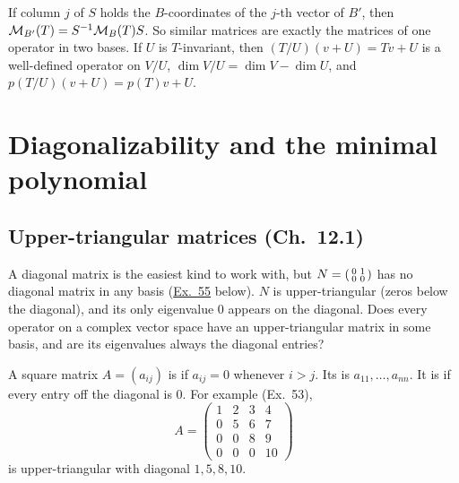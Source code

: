 \documentclass[10pt]{scrartcl}
\begin{document}
\begin{enumerate}[label=(T\arabic*),leftmargin=2.6em,itemsep=8pt]
  \ii {} If column $j$ of $S$ holds the $B$-coordinates of the $j$-th vector of $B'$, then $\mathcal M_{B'}(T)=S^{-1}\mathcal M_B(T)S$. So similar matrices are exactly the matrices of one operator in two bases.
  \ii {} If $U$ is $T$-invariant, then $(T/U)(v+U)=Tv+U$ is a well-defined operator on $V/U$, $\dim V/U=\dim V-\dim U$, and $p(T/U)(v+U)=p(T)v+U$.
\end{enumerate}

\section{Diagonalizability and the minimal polynomial}
\subsection{Upper-triangular matrices (Ch.~12.1)}

\begin{qbox}
  A diagonal matrix is the easiest kind to work with, but $N=\begin{psmallmatrix}0&1\\0&0\end{psmallmatrix}$ has no diagonal matrix in any basis (\hyperref[ex-55]{Ex.~55} below). $N$ is upper-triangular (zeros below the diagonal), and its only eigenvalue $0$ appears on the diagonal. Does every operator on a complex vector space have an upper-triangular matrix in some basis, and are its eigenvalues always the diagonal entries?
\end{qbox}

\begin{definition*}\hypertarget{def-33}{}\label{def-33}
  A square matrix $A=(a_{ij})$ is  if $a_{ij}=0$ whenever $i>j$. Its  is $a_{11},\dots,a_{nn}$. It is  if every entry off the diagonal is $0$. For example (Ex.~53),
  \[
    A = \begin{pmatrix}1&2&3&4\\0&5&6&7\\0&0&8&9\\0&0&0&10\end{pmatrix}
  \]
  is upper-triangular with diagonal $1,5,8,10$.
\end{definition*}
\end{document}
